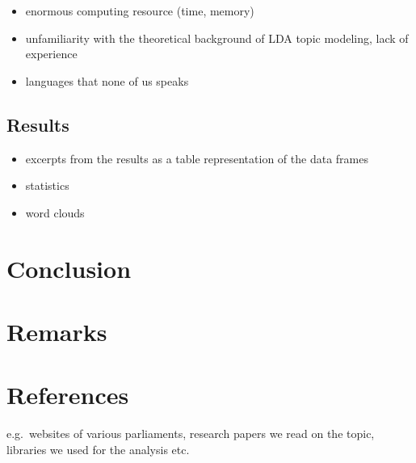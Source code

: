 \documentclass[
  12pt,
]{scrreprt}
\providecommand{\tightlist}{%
  \setlength{\itemsep}{0pt}\setlength{\parskip}{0pt}}
\begin{document}
\begin{itemize}
\tightlist
\item
  enormous computing resource (time, memory)
\item
  unfamiliarity with the theoretical background of LDA topic modeling,
  lack of experience
\item
  languages that none of us speaks
\end{itemize}

\hypertarget{results}{%
\section{Results}\label{results}}

\begin{itemize}
\tightlist
\item
  excerpts from the results as a table representation of the data frames
\item
  statistics
\item
  word clouds
\end{itemize}

\hypertarget{conclusion}{%
\chapter{Conclusion}\label{conclusion}}

\hypertarget{remarks}{%
\chapter{Remarks}\label{remarks}}

\hypertarget{references}{%
\chapter{References}\label{references}}

e.g.~websites of various parliaments, research papers we read on the
topic, libraries we used for the analysis etc.
\end{document}
